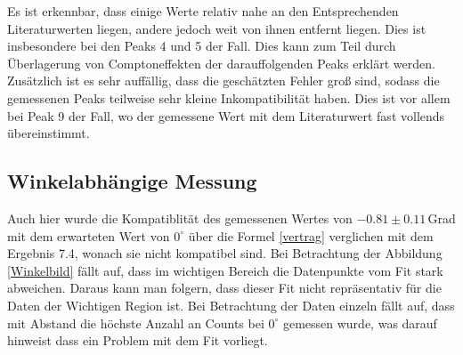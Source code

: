 Es ist erkennbar, dass einige Werte relativ nahe an den Entsprechenden Literaturwerten liegen, andere jedoch weit von ihnen entfernt liegen. Dies ist insbesondere bei den Peaks 4 und 5 der Fall. Dies kann zum Teil durch Überlagerung von Comptoneffekten der darauffolgenden Peaks erklärt werden. Zusätzlich ist es sehr auffällig, dass die geschätzten Fehler groß sind, sodass die gemessenen Peaks teilweise sehr kleine Inkompatibilität haben. Dies ist vor allem bei Peak 9 der Fall, wo der gemessene Wert mit dem Literaturwert fast vollends übereinstimmt. 
\subsection{Winkelabhängige Messung}
Auch hier wurde die Kompatiblität des gemessenen Wertes von $-0.81\pm0.11\,$Grad mit dem erwarteten Wert von $0^\circ$ über die Formel \ref{vertrag} verglichen mit dem Ergebnis 7.4, wonach sie nicht kompatibel sind. Bei Betrachtung der Abbildung \ref{Winkelbild} fällt auf, dass im wichtigen Bereich die Datenpunkte vom Fit stark abweichen. Daraus kann man folgern, dass dieser Fit nicht repräsentativ für die Daten der Wichtigen Region ist. Bei Betrachtung der Daten einzeln fällt auf, dass mit Abstand die höchste Anzahl an Counts bei $0^\circ$ gemessen wurde, was darauf hinweist dass ein Problem mit dem Fit vorliegt.